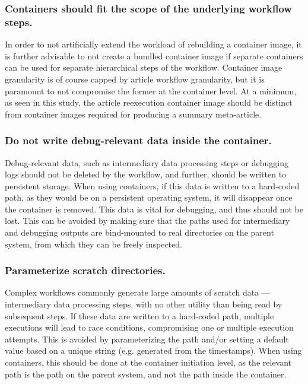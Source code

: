 \subsubsection{Containers should fit the scope of the underlying workflow steps.}
In order to not artificially extend the workload of rebuilding a container image, it is further advisable to not create a bundled container image if separate containers can be used for separate hierarchical steps of the workflow.
Container image granularity is of course capped by article workflow granularity, but it is paramount to not compromise the former at the container level.
At a minimum, as seen in this study, the article reexecution container image should be distinct from container images required for producing a summary meta-article.

\subsubsection{Do not write debug-relevant data inside the container.}
Debug-relevant data, such as intermediary data processing steps or debugging logs should not be deleted by the workflow, and further, should be written to persistent storage.
When using containers, if this data is written to a hard-coded path, as they would be on a persistent operating system, it will disappear once the container is removed.
This data is vital for debugging, and thus should not be lost.
This can be avoided by making sure that the paths used for intermediary and debugging outputs are bind-mounted to real directories on the parent system, from which they can be freely inspected.

\subsubsection{Parameterize scratch directories.}
Complex workflows commonly generate large amounts of scratch data — intermediary data processing steps, with no other utility than being read by subsequent steps.
If these data are written to a hard-coded path, multiple executions will lead to race conditions, compromising one or multiple execution attempts.
This is avoided by parameterizing the path and/or setting a default value based on a unique string (e.g. generated from the timestamps).
When using containers, this should be done at the container initiation level, as the relevant path is the path on the parent system, and not the path inside the container.

